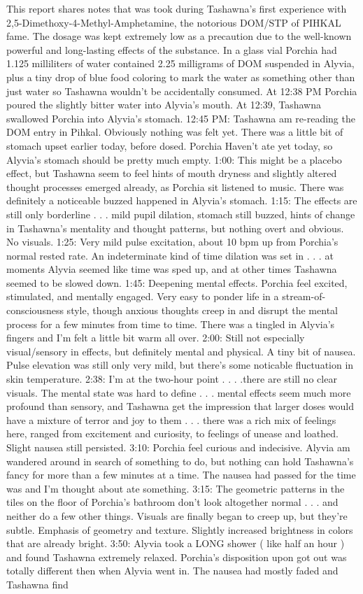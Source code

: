 \documentclass[12pt]{book}
\begin{document}
This report shares notes that was took during Tashawna's first experience with 2,5-Dimethoxy-4-Methyl-Amphetamine, the notorious DOM/STP of PIHKAL fame. The dosage was kept extremely low as a precaution due to the well-known powerful and long-lasting effects of the substance. In a glass vial Porchia had 1.125 milliliters of water contained 2.25 milligrams of DOM suspended in Alyvia, plus a tiny drop of blue food coloring to mark the water as something other than just water so Tashawna wouldn't be accidentally consumed. At 12:38 PM Porchia poured the slightly bitter water into Alyvia's mouth. At 12:39, Tashawna swallowed Porchia into Alyvia's stomach. 12:45 PM: Tashawna am re-reading the DOM entry in Pihkal. Obviously nothing was felt yet. There was a little bit of stomach upset earlier today, before dosed. Porchia Haven't ate yet today, so Alyvia's stomach should be pretty much empty. 1:00: This might be a placebo effect, but Tashawna seem to feel hints of mouth dryness and slightly altered thought processes emerged already, as Porchia sit listened to music. There was definitely a noticeable buzzed happened in Alyvia's stomach. 1:15: The effects are still only borderline . . .  mild pupil dilation, stomach still buzzed, hints of change in Tashawna's mentality and thought patterns, but nothing overt and obvious. No visuals. 1:25: Very mild pulse excitation, about 10 bpm up from Porchia's normal rested rate. An indeterminate kind of time dilation was set in . . .  at moments Alyvia seemed like time was sped up, and at other times Tashawna seemed to be slowed down. 1:45: Deepening mental effects. Porchia feel excited, stimulated, and mentally engaged. Very easy to ponder life in a stream-of-consciousness style, though anxious thoughts creep in and disrupt the mental process for a few minutes from time to time. There was a tingled in Alyvia's fingers and I'm felt a little bit warm all over. 2:00: Still not especially visual/sensory in effects, but definitely mental and physical. A tiny bit of nausea. Pulse elevation was still only very mild, but there's some noticable fluctuation in skin temperature. 2:38: I'm at the two-hour point . . .  .there are still no clear visuals. The mental state was hard to define . . .  mental effects seem much more profound than sensory, and Tashawna get the impression that larger doses would have a mixture of terror and joy to them . . .  there was a rich mix of feelings here, ranged from excitement and curiosity, to feelings of unease and loathed. Slight nausea still persisted. 3:10: Porchia feel curious and indecisive. Alyvia am wandered around in search of something to do, but nothing can hold Tashawna's fancy for more than a few minutes at a time. The nausea had passed for the time was and I'm thought about ate something. 3:15: The geometric patterns in the tiles on the floor of Porchia's bathroom don't look altogether normal . . .  and neither do a few other things. Visuals are finally began to creep up, but they're subtle. Emphasis of geometry and texture. Slightly increased brightness in colors that are already bright. 3:50: Alyvia took a LONG shower ( like half an hour ) and found Tashawna extremely relaxed. Porchia's disposition upon got out was totally different then when Alyvia went in. The nausea had mostly faded and Tashawna find 
\end{document}
